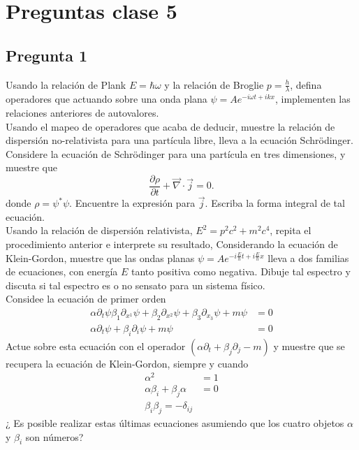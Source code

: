 \documentclass[../main_ej.tex]{subfiles}
\begin{document}
\section{Preguntas clase 5}

\subsection{Pregunta 1}
Usando la relación de Plank  $E=\hbar \omega$ y la relación de Broglie $p=\frac{h}{\lambda}$, defina operadores que actuando sobre una onda plana $\psi=Ae^{-i\omega t+ikx}$, implementen las relaciones anteriores de autovalores. \\
Usando el mapeo de operadores que acaba de deducir, muestre la relación de dispersión no-relativista para una partícula libre, lleva a la ecuación Schrödinger. \\
Considere la ecuación de Schrödinger para una partícula en tres dimensiones, y muestre que
\begin{equation*}
  \frac{\partial \rho}{\partial t} + \vec{\nabla} \cdot \vec{j} = 0.
\end{equation*}
donde $\rho=\psi^*\psi$. Encuentre la expresión para $\vec{j}$. Escriba la forma integral de tal ecuación. \\
Usando la relación de dispersión relativista, $E^2=p^2c^2 + m^2c^4$, repita el procedimiento anterior e interprete su resultado, Considerando la ecuación de Klein-Gordon, muestre que las ondas planas $  \psi=Ae^{-i\frac{E}{h}t + i\frac{E}{h}x}$ lleva a dos familias de ecuaciones, con energía $E$ tanto positiva como negativa. Dibuje tal espectro y discuta si tal espectro es  o no sensato para un sistema físico.\\
Considee la ecuación de primer orden 
\begin{align*}
  \alpha \partial_t \psi \beta_1 \partial_{x^1}\psi + \beta_2 \partial_{x^2}\psi + \beta_3\partial_{x_3}\psi + m\psi  & = 0 \\
  \alpha \partial_t \psi + \beta_i \partial_i\psi + m\psi & = 0
\end{align*}
Actue sobre esta ecuación con el operador $(\alpha \partial_t+\beta_j\partial_j - m)$ y muestre que se recupera la ecuación de Klein-Gordon, siempre y cuando
\begin{align*}
  \alpha^2  & = 1 \\
  \alpha \beta_i + \beta_j \alpha & = 0 \\
  \beta_i\beta_j = -\delta_{ij}
\end{align*}
¿ Es posible realizar estas últimas ecuaciones asumiendo que los cuatro objetos $\alpha$ y $\beta_i$ son números? \\
\end{document}
